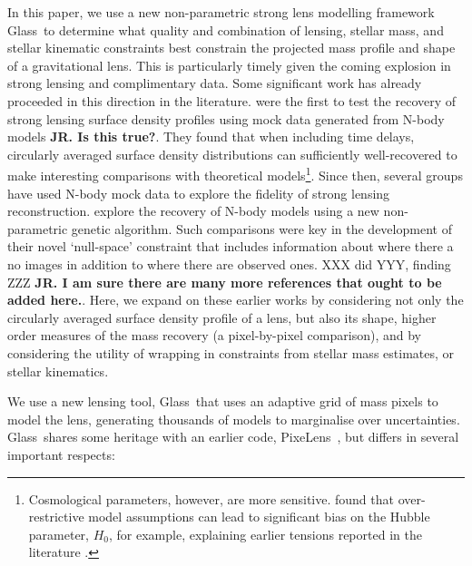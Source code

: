 \documentclass[galley,usenatbib]{mn2e}
\newcommand{\Glass}{{\sc Glass}}
\newcommand{\PixeLens}{{\sc PixeLens}}
\begin{document}

In this paper, we use a new non-parametric strong lens modelling framework
\Glass\ to determine what quality and combination of lensing, stellar mass, and
stellar kinematic constraints best constrain the projected mass profile and
shape of a gravitational lens. This is particularly timely given the coming
explosion in strong lensing and complimentary data. Some significant work has
already proceeded in this direction in the literature.
\citet{2007ApJ...667..645R} were the first to test the recovery of strong
lensing surface density profiles using mock data generated from N-body models
{\bf JR. Is this true?}. They found that when including time delays, circularly
averaged surface density distributions can sufficiently well-recovered to make
interesting comparisons with theoretical models\footnote{Cosmological
parameters, however, are more sensitive. \citet{2007ApJ...667..645R} found that
over-restrictive model assumptions can lead to significant bias on the Hubble
parameter, $H_0$, for example, explaining earlier tensions reported in the
literature \citep[e.g.][]{2002astro.ph..4043K}.}. Since then, several groups
have used N-body mock data to explore the fidelity of strong lensing
reconstruction. \citet{2007MNRAS.380.1729L} explore the recovery of N-body
models using a new non-parametric genetic algorithm. Such comparisons were key
in the development of their novel `null-space' constraint that includes
information about where there a no images in addition to where there are
observed ones. XXX did YYY, finding ZZZ {\bf JR. I am sure there are many more
references that ought to be added here.}. Here, we expand on these earlier
works by considering not only the circularly averaged surface density profile
of a lens, but also its shape, higher order measures of the mass recovery (a
pixel-by-pixel comparison), and by considering the utility of wrapping in
constraints from stellar mass estimates, or stellar kinematics. 

We use a new lensing tool, \Glass\, that uses an adaptive grid of mass pixels
to model the lens, generating thousands of models to marginalise over
uncertainties. \Glass\ shares some heritage with an earlier code, \PixeLens\
\citep{1997MNRAS.292..148S,2008ApJ...679...17C}, but differs in several
important respects: 
\end{document}
